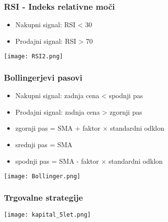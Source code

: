 \documentclass{beamer}
\begin{document}
%
%
%

\begin{frame}
\frametitle{RSI - Indeks relativne moči}
\begin{itemize}
\item Nakupni signal: RSI < 30
\item Prodajni signal: RSI > 70
\end{itemize}

\texttt{[image: RSI2.png]}

\end{frame}


\begin{frame}
\frametitle{Bollingerjevi pasovi}
\begin{itemize}
\item Nakupni signal: zadnja cena < spodnji pas
\item Prodajni signal: zadnja cena > zgornji pas
\end{itemize}
\begin{itemize}
\item zgornji pas = SMA + faktor $\times$ standardni odklon
\item srednji pas = SMA
\item spodnji pas = SMA - faktor $\times$ standardni odklon
\end{itemize}
\texttt{[image: Bollinger.png]}

\end{frame}


\begin{frame}
\frametitle{Trgovalne strategije}
\texttt{[image: kapital\_5let.png]}
\end{frame}
\end{document}
